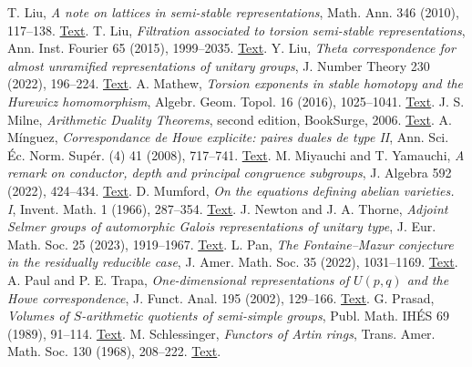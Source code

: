 T. Liu, \emph{A note on lattices in semi-stable representations}, Math. Ann. 346 (2010), 117--138. \href{https://www.math.purdue.edu/~tongliu/pub/latticesnew2.pdf}{Text}.
 T. Liu, \emph{Filtration associated to torsion semi-stable representations}, Ann. Inst. Fourier 65 (2015), 1999--2035. \href{https://www.math.purdue.edu/~tongliu/pub/filtrationnew.pdf}{Text}.
 Y. Liu, \emph{Theta correspondence for almost unramified representations of unitary groups}, J. Number Theory 230 (2022), 196--224. \href{https://doi.org/10.1016/j.jnt.2021.03.027}{Text}.
 A. Mathew, \emph{Torsion exponents in stable homotopy and the Hurewicz homomorphism}, Algebr. Geom. Topol. 16 (2016), 1025--1041. \href{https://arxiv.org/pdf/1501.07561}{Text}.
 J. S. Milne, \emph{Arithmetic Duality Theorems}, second edition, BookSurge, 2006. \href{https://www.jmilne.org/math/Books/adt.html}{Text}.
 A. Mínguez, \emph{Correspondance de Howe explicite: paires duales de type II}, Ann. Sci. Éc. Norm. Supér. (4) 41 (2008), 717--741. \href{https://doi.org/10.24033/asens.2080}{Text}.
 M. Miyauchi and T. Yamauchi, \emph{A remark on conductor, depth and principal congruence subgroups}, J. Algebra 592 (2022), 424--434. \href{https://arxiv.org/pdf/2107.08130}{Text}.
 D. Mumford, \emph{On the equations defining abelian varieties. I}, Invent. Math. 1 (1966), 287--354. \href{https://pazuki.perso.math.cnrs.fr/index_fichiers/Mumford66.pdf}{Text}.
 J. Newton and J. A. Thorne, \emph{Adjoint Selmer groups of automorphic Galois representations of unitary type}, J. Eur. Math. Soc. 25 (2023), 1919--1967. \href{https://ems.press/content/serial-article-files/32858}{Text}.
 L. Pan, \emph{The Fontaine--Mazur conjecture in the residually reducible case}, J. Amer. Math. Soc. 35 (2022), 1031--1169. \href{https://doi.org/10.1090/jams/991}{Text}.
 A. Paul and P. E. Trapa, \emph{One-dimensional representations of $U(p,q)$ and the Howe correspondence}, J. Funct. Anal. 195 (2002), 129--166. \href{https://www.math.utah.edu/~ptrapa/char6_4.pdf}{Text}.
 G. Prasad, \emph{Volumes of $S$-arithmetic quotients of semi-simple groups}, Publ. Math. IHÉS 69 (1989), 91--114. \href{https://www.numdam.org/articles/10.1007/BF02698841/}{Text}.
 M. Schlessinger, \emph{Functors of Artin rings}, Trans. Amer. Math. Soc. 130 (1968), 208--222. \href{https://math.uchicago.edu/~amathew/schlessingerdef.pdf}{Text}.
